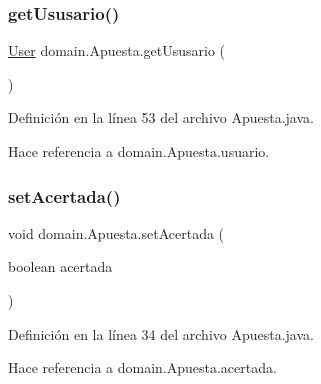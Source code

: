\subsubsection{\texorpdfstring{getUsusario()}{getUsusario()}}
{\footnotesize\ttfamily \mbox{\hyperlink{classdomain_1_1User}{User}} domain.\+Apuesta.\+get\+Ususario (\begin{DoxyParamCaption}{ }\end{DoxyParamCaption})}



Definición en la línea 53 del archivo Apuesta.\+java.


\begin{DoxyCode}{0}

\end{DoxyCode}


Hace referencia a domain.\+Apuesta.\+usuario.

\mbox{\label{classdomain_1_1Apuesta_a7a57b0ad3b625f2a7228809f59c2fcfa}} 
\subsubsection{\texorpdfstring{setAcertada()}{setAcertada()}}
{\footnotesize\ttfamily void domain.\+Apuesta.\+set\+Acertada (\begin{DoxyParamCaption}\item[{boolean}]{acertada }\end{DoxyParamCaption})}



Definición en la línea 34 del archivo Apuesta.\+java.


\begin{DoxyCode}{0}

\end{DoxyCode}


Hace referencia a domain.\+Apuesta.\+acertada.



